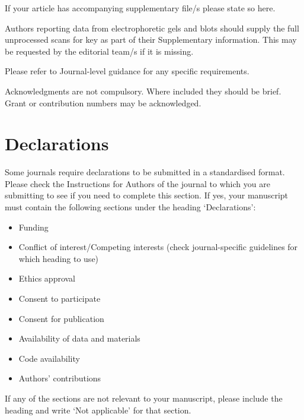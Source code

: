 \documentclass[default,pdflatex,iicol]{sn-jnl}%
\begin{document}
If your article has accompanying supplementary file/s please state so here. 

Authors reporting data from electrophoretic gels and blots should supply the full unprocessed scans for key as part of their Supplementary information. This may be requested by the editorial team/s if it is missing.

Please refer to Journal-level guidance for any specific requirements.


Acknowledgments are not compulsory. Where included they should be brief. Grant or contribution numbers may be acknowledged.

\section*{Declarations}

Some journals require declarations to be submitted in a standardised format. Please check the Instructions for Authors of the journal to which you are submitting to see if you need to complete this section. If yes, your manuscript must contain the following sections under the heading `Declarations':

\begin{itemize}
\item Funding
\item Conflict of interest/Competing interests (check journal-specific guidelines for which heading to use)
\item Ethics approval 
\item Consent to participate
\item Consent for publication
\item Availability of data and materials
\item Code availability 
\item Authors' contributions
\end{itemize}

\noindent
If any of the sections are not relevant to your manuscript, please include the heading and write `Not applicable' for that section. 



\end{document}
